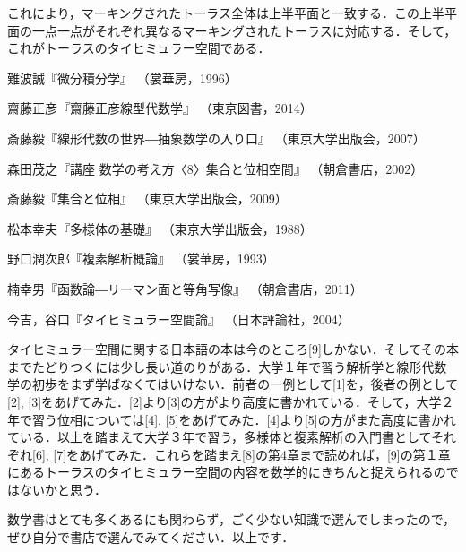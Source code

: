 \begin{figure}[h]
\begin{minipage}{0.5\hsize}
\end{minipage}
\begin{minipage}{0.5\hsize}
\end{minipage}
\end{figure}
これにより，マーキングされたトーラス全体は上半平面と一致する．この上半平面の一点一点がそれぞれ異なるマーキングされたトーラスに対応する．そして，これがトーラスのタイヒミュラー空間である．
\begin{thebibliography}{9}
\item
難波誠『微分積分学』
（裳華房，1996）
\item
齋藤正彦『齋藤正彦線型代数学』
（東京図書，2014）
\item
斎藤毅『線形代数の世界―抽象数学の入り口』
（東京大学出版会，2007）
\item
森田茂之『講座 数学の考え方〈8〉集合と位相空間』
（朝倉書店，2002）
\item
斎藤毅『集合と位相』
（東京大学出版会，2009）
\item
松本幸夫『多様体の基礎』
（東京大学出版会，1988）
\item
野口潤次郎『複素解析概論』
（裳華房，1993）
\item
楠幸男『函数論―リーマン面と等角写像』
（朝倉書店，2011）
\item
今吉，谷口『タイヒミュラー空間論』
（日本評論社，2004）
\end{thebibliography}

タイヒミュラー空間に関する日本語の本は今のところ[9]しかない．そしてその本までたどりつくには少し長い道のりがある．大学１年で習う解析学と線形代数学の初歩をまず学ばなくてはいけない．前者の一例として[1]を，後者の例として[2], [3]をあげてみた．[2]より[3]の方がより高度に書かれている．そして，大学２年で習う位相については[4], [5]をあげてみた．[4]より[5]の方がまた高度に書かれている．以上を踏まえて大学３年で習う，多様体と複素解析の入門書としてそれぞれ[6], [7]をあげてみた．これらを踏まえ[8]の第4章まで読めれば，[9]の第１章にあるトーラスのタイヒミュラー空間の内容を数学的にきちんと捉えられるのではないかと思う．

数学書はとても多くあるにも関わらず，ごく少ない知識で選んでしまったので，ぜひ自分で書店で選んでみてください．以上です．







